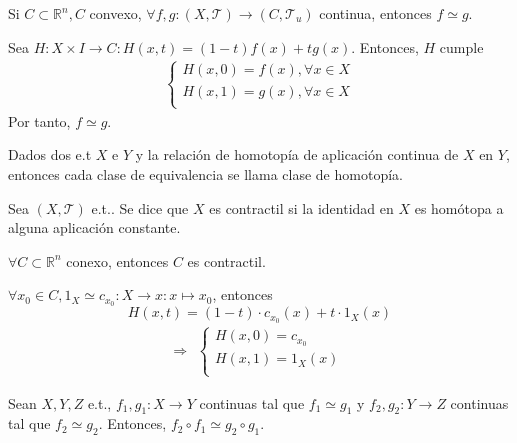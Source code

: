 \begin{ejm}
  Si $C \subset \mathbb{R}^{n}, C $ convexo, $\forall f, g : ( X, \mathcal{T} ) \to ( C, \mathcal{T}_{u} )$ continua, entonces $f \simeq g$.
\end{ejm}

\begin{dem}
  Sea $H : X \times I \to C : H(x,t) = (1 - t) f(x) + t g(x)$. Entonces, $H$ cumple
  \[ 
    \begin{aligned}
      \begin{cases}
        H(x, 0) = f(x), \forall x \in X \\
        H(x, 1) = g(x), \forall x \in X \\
      \end{cases}
    \end{aligned} 
  \] 
  Por tanto, $f \simeq g$.
\end{dem}

\begin{defn}
  Dados dos e.t $X$ e $Y$ y la relación de homotopía de aplicación continua de $X$ en $Y$, entonces cada clase de equivalencia se llama clase de homotopía.
\end{defn}

\begin{defn}[Contractil]
  Sea $( X, \mathcal{T} )$ e.t.. Se dice que $X$ es contractil si la identidad en $X$ es homótopa a alguna aplicación constante.
\end{defn}

\begin{ejm}
  $\forall C \subset \mathbb{R}^{n}$ conexo, entonces $C$ es contractil.
\end{ejm}

\begin{dem}
  $\forall x_{0} \in C, 1_{X} \simeq c_{x_{0}} : X \to x : x \mapsto x_{0}$, entonces
  \[ 
    H(x,t) = (1 - t) \cdot c_{x_{0}}(x) + t \cdot 1_{X}(x) 
  \] 
  \[ 
    \Rightarrow  
    \begin{aligned}
      \begin{cases}
        H(x,0) = c_{x_{0}} \\
        H(x,1) = 1_{X}(x) \\
      \end{cases}
    \end{aligned} 
  \] 
\end{dem}

\begin{prop}
  Sean $X, Y, Z$ e.t., $f_{1}, g_{1} : X \to Y$ continuas tal que $f_{1} \simeq g_{1}$ y $f_{2}, g_{2} : Y \to Z$ continuas tal que $f_{2} \simeq g_{2}$. Entonces, $f_{2} \circ f_{1} \simeq g_{2} \circ g_{1}$.
\end{prop}

